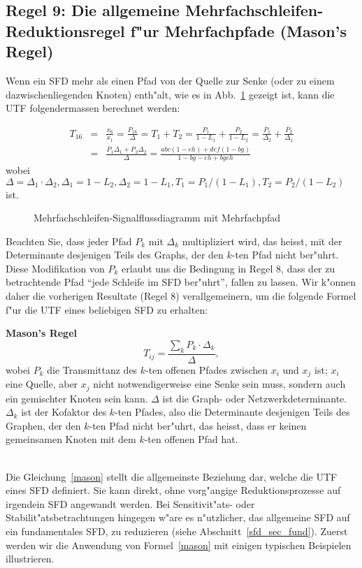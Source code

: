 \subsection{Regel 9: Die allgemeine Mehrfachschleifen-Reduktionsregel f"ur Mehrfachpfade (Mason's Regel)}
Wenn ein SFD mehr als einen Pfad von der Quelle zur
Senke (oder zu einem dazwischenliegenden Knoten) enth"alt, wie es in
Abb.~\ref{SFD21} gezeigt ist, kann die UTF folgendermassen berechnet werden: 

\begin{eqnarray*}
  T_{16} & = & \frac{x_6}{x_1} = \frac{P_{16}}{\Delta} = T_1 + T_2 = \frac{P_1}{1-L_1}+ \frac{P_2}{1-L_2}=\frac{P_1}{\Delta_2}+ \frac{P_2}{\Delta_1}\\
  & = & \frac{P_1\Delta_1+P_2\Delta_2}{\Delta} = \frac{abc(1-eh) + def(1-bg)}{1-bg-eh+bgeh}
\end{eqnarray*}
\nit wobei $\Delta=\Delta_1\cdot\Delta_2, \Delta_1=1-L_2, \Delta_2=1-L_1,T_1 = P_1/(1-L_1), T_2 = P_2/(1-L_2)$ ist.  
\begin{figure}[htb!]
\begin{center}
  \caption{Mehrfachschleifen-Signalflussdiagramm mit Mehrfachpfad}\label{SFD21}\end{center}
\vspace*{-7mm}
\end{figure}
\nit Beachten Sie, dass jeder Pfad $P_k$ mit $\Delta_k$ multipliziert wird, das heisst, mit der Determinante desjenigen Teils des Graphs, der den
$k$-ten Pfad nicht ber"uhrt. Diese Modifikation von $P_k$ erlaubt uns
die Bedingung in Regel 8, dass der zu betrachtende Pfad ``jede
Schleife im SFD ber"uhrt'', fallen zu lassen. Wir
k"onnen daher die vorherigen Resultate (Regel 8) verallgemeinern, um
die folgende Formel f"ur die UTF eines beliebigen
SFD zu erhalten:
\begin{DFrame}
{\bf Mason's Regel}
\begin{equation}
  T_{ij} = \frac{\sum\limits_k P_k\cdot\Delta_k}{\Delta},\label{mason}
\end{equation}
wobei $P_k$ die Transmittanz des $k$-ten offenen Pfades
zwischen $x_i$ und $x_j$ ist; $x_i$ eine Quelle, aber $x_j$ nicht
notwendigerweise eine Senke sein muss, sondern auch ein gemischter
Knoten sein kann.  $\Delta$ ist die Graph- oder Netzwerkdeterminante.  $\Delta_k$
ist der Kofaktor des $k$-ten Pfades, also die Determinante desjenigen
Teils des Graphen, der den $k$-ten Pfad nicht ber"uhrt, das heisst, dass
er keinen gemeinsamen Knoten mit dem $k$-ten offenen Pfad hat.  
\end{DFrame}\\
\nit Die Gleichung~\ref{mason} stellt die allgemeinste Beziehung dar,
welche die UTF eines SFD definiert. Sie kann direkt, ohne vorg"angige
Reduktionsprozesse auf irgendein SFD angewandt werden.  Bei
Sensitivit"ats- oder Stabilit"atsbetrachtungen hingegen w"are es
n"utzlicher, das allgemeine SFD auf ein fundamentales SFD, zu
reduzieren (siehe Abschnitt~\ref{sfd_sec_fund}). Zuerst werden wir die Anwendung von Formel~\ref{mason}
mit einigen typischen Beispielen illustrieren.\\

